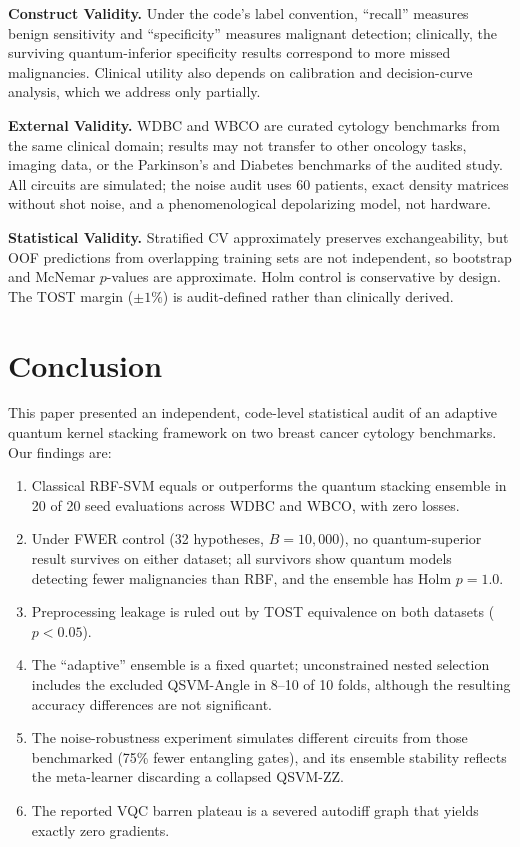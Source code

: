 \documentclass[journal,twocolumn]{IEEEtran}
\begin{document}
\textbf{Construct Validity.} Under the code's label convention, ``recall'' measures benign sensitivity and ``specificity'' measures malignant detection; clinically, the surviving quantum-inferior specificity results correspond to more missed malignancies. Clinical utility also depends on calibration and decision-curve analysis, which we address only partially.

\textbf{External Validity.} WDBC and WBCO are curated cytology benchmarks from the same clinical domain; results may not transfer to other oncology tasks, imaging data, or the Parkinson's and Diabetes benchmarks of the audited study. All circuits are simulated; the noise audit uses 60 patients, exact density matrices without shot noise, and a phenomenological depolarizing model, not hardware.

\textbf{Statistical Validity.} Stratified CV approximately preserves exchangeability, but OOF predictions from overlapping training sets are not independent, so bootstrap and McNemar $p$-values are approximate. Holm control is conservative by design. The TOST margin ($\pm1\%$) is audit-defined rather than clinically derived.

\section{Conclusion}
\label{sec:conclusion}

This paper presented an independent, code-level statistical audit of an adaptive quantum kernel stacking framework on two breast cancer cytology benchmarks. Our findings are:
\begin{enumerate}
    \item Classical RBF-SVM equals or outperforms the quantum stacking ensemble in 20 of 20 seed evaluations across WDBC and WBCO, with zero losses.
    \item Under FWER control (32 hypotheses, $B=10{,}000$), no quantum-superior result survives on either dataset; all survivors show quantum models detecting fewer malignancies than RBF, and the ensemble has Holm $p=1.0$.
    \item Preprocessing leakage is ruled out by TOST equivalence on both datasets ($p < 0.05$).
    \item The ``adaptive'' ensemble is a fixed quartet; unconstrained nested selection includes the excluded QSVM-Angle in 8--10 of 10 folds, although the resulting accuracy differences are not significant.
    \item The noise-robustness experiment simulates different circuits from those benchmarked (75\% fewer entangling gates), and its ensemble stability reflects the meta-learner discarding a collapsed QSVM-ZZ.
    \item The reported VQC barren plateau is a severed autodiff graph that yields exactly zero gradients.
\end{enumerate}
\end{document}
